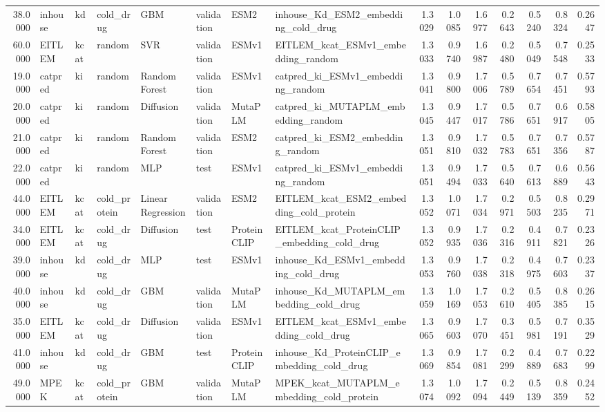 \begin{tabular}{rlllllllrrrrrrr}
38.0000 & inhouse & kd & cold_drug & GBM & validation & ESM2 & inhouse_Kd_ESM2_embedding_cold_drug & 1.3029 & 1.0085 & 1.6977 & 0.2643 & 0.5240 & 0.8324 & 0.2647 \\
60.0000 & EITLEM & kcat & random & SVR & validation & ESMv1 & EITLEM_kcat_ESMv1_embedding_random & 1.3033 & 0.9740 & 1.6987 & 0.2480 & 0.5049 & 0.7548 & 0.2533 \\
19.0000 & catpred & ki & random & Random Forest & validation & ESMv1 & catpred_ki_ESMv1_embedding_random & 1.3041 & 0.9800 & 1.7006 & 0.5789 & 0.7654 & 0.7451 & 0.5793 \\
20.0000 & catpred & ki & random & Diffusion & validation & MutaPLM & catpred_ki_MUTAPLM_embedding_random & 1.3045 & 0.9447 & 1.7017 & 0.5786 & 0.7651 & 0.6917 & 0.5805 \\
21.0000 & catpred & ki & random & Random Forest & validation & ESM2 & catpred_ki_ESM2_embedding_random & 1.3051 & 0.9810 & 1.7032 & 0.5783 & 0.7651 & 0.7356 & 0.5787 \\
22.0000 & catpred & ki & random & MLP & test & ESMv1 & catpred_ki_ESMv1_embedding_random & 1.3051 & 0.9494 & 1.7033 & 0.5640 & 0.7613 & 0.6889 & 0.5643 \\
44.0000 & EITLEM & kcat & cold_protein & Linear Regression & validation & ESM2 & EITLEM_kcat_ESM2_embedding_cold_protein & 1.3052 & 1.0071 & 1.7034 & 0.2971 & 0.5503 & 0.8235 & 0.2971 \\
34.0000 & EITLEM & kcat & cold_drug & Diffusion & test & ProteinCLIP & EITLEM_kcat_ProteinCLIP_embedding_cold_drug & 1.3052 & 0.9935 & 1.7036 & 0.2316 & 0.4911 & 0.7821 & 0.2326 \\
39.0000 & inhouse & kd & cold_drug & MLP & test & ESMv1 & inhouse_Kd_ESMv1_embedding_cold_drug & 1.3053 & 0.9760 & 1.7038 & 0.2318 & 0.4975 & 0.7603 & 0.2337 \\
40.0000 & inhouse & kd & cold_drug & GBM & validation & MutaPLM & inhouse_Kd_MUTAPLM_embedding_cold_drug & 1.3059 & 1.0169 & 1.7053 & 0.2610 & 0.5405 & 0.8385 & 0.2615 \\
35.0000 & EITLEM & kcat & cold_drug & Diffusion & validation & ESMv1 & EITLEM_kcat_ESMv1_embedding_cold_drug & 1.3065 & 0.9603 & 1.7070 & 0.3451 & 0.5981 & 0.7191 & 0.3529 \\
41.0000 & inhouse & kd & cold_drug & GBM & test & ProteinCLIP & inhouse_Kd_ProteinCLIP_embedding_cold_drug & 1.3069 & 0.9854 & 1.7081 & 0.2299 & 0.4889 & 0.7683 & 0.2299 \\
49.0000 & MPEK & kcat & cold_protein & GBM & validation & MutaPLM & MPEK_kcat_MUTAPLM_embedding_cold_protein & 1.3074 & 1.0092 & 1.7094 & 0.2449 & 0.5139 & 0.8359 & 0.2452 \\

\end{tabular}
